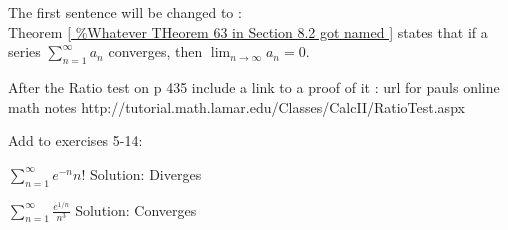 \documentclass[10pt]{article}
\newcommand{\ds}{\displaystyle}
\begin{document}
The first sentence will be changed to :\\
	Theorem \ref{ %
} states that if a series $\ds\sum_{n=1}^\infty a_n$ converges, then $\ds \lim_{n\to \infty} a_n =0$.  



After the Ratio test on p 435 include a link to a proof of it : url for pauls online math notes
http://tutorial.math.lamar.edu/Classes/CalcII/RatioTest.aspx



Add to exercises 5-14:

$\ds\sum_{n=1}^\infty e^{-n}n!$		Solution: Diverges

$\ds \sum_{n=1}^\infty \frac{e^{1/n}}{n^3}$		Solution: Converges
\end{document}

